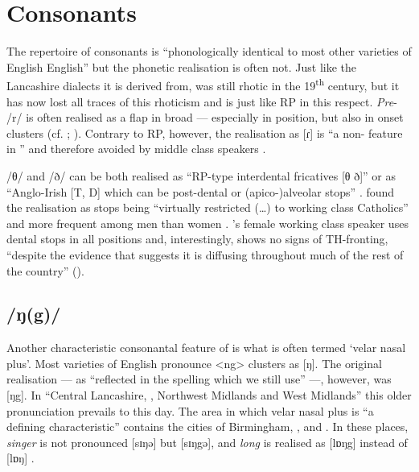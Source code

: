 	\section{Consonants}\label{sec.var.con}

The repertoire of  consonants is ``phonologically identical to most other varieties of English English'' \citep[351]{watson2007} but the phonetic realisation is often not.
Just like the Lancashire dialects it is derived from,  was still rhotic in the 19\textsuperscript{th} century, but it has now lost all traces of this rhoticism \citep[cf.][149]{knowles1997} and is just like RP in this respect.
\emph{Pre}- /r/ is often realised as a flap in broad  --- especially in  position, but also in onset clusters (cf. \citealt[107 and 329--330]{knowles1973}; \citealt[352]{watson2007}).
Contrary to RP, however, the realisation as [ɾ] is ``a non- feature in '' and therefore avoided by middle class speakers \citep[329]{knowles1973}.

/θ/ and /ð/ can be both realised as ``RP-type interdental fricatives [θ ð]'' or as ``Anglo-Irish [T, D] which can be post-dental or (apico-)alveolar stops'' \citep[323]{knowles1973}.
\citeauthor{knowles1973} found the realisation as stops being ``virtually restricted (\ldots) to working class Catholics'' and more frequent among men than women \citep[323--324]{knowles1973}.
\cite{watson2007}'s female working class speaker uses dental stops in all positions and, interestingly, shows no signs of TH-fronting, ``despite the evidence that suggests it is diffusing throughout much of the rest of the country'' (\cite[cf.][352]{watson2007}).

		\subsection{/ŋ(g)/}\label{sec.var.con.ng}

Another characteristic consonantal feature of  is what is often termed `velar nasal plus'.
Most varieties of English pronounce  <ng> clusters as [ŋ].
The original realisation --- as ``reflected in the spelling which we still use'' \citep[58]{trudgill1999} ---, however, was [ŋg]. In ``Central Lancashire, , Northwest Midlands and West Midlands'' \citep[58]{trudgill1999} this older pronunciation prevails to this day. 
The area in which velar nasal plus is ``a defining characteristic'' \citep[58]{trudgill1999} contains the cities of Birmingham, , and .
In these places, \emph{singer} is not pronounced [sɪŋə] but [sɪŋgə], and \emph{long} is realised as [lɒŋg] instead of [lɒŋ] \citep[cf.][58]{trudgill1999}.

